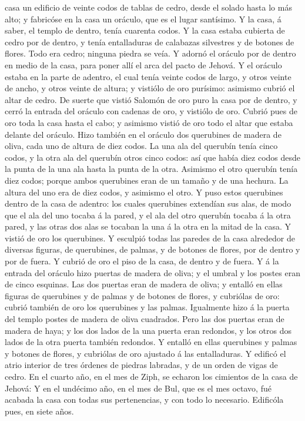 casa un edificio de veinte codos de tablas de cedro, desde el solado
hasta lo más alto; y fabricóse en la casa un oráculo, que es el lugar
santísimo.  Y la casa, á saber, el templo de dentro, tenía
cuarenta codos.  Y la casa estaba cubierta de cedro por de
dentro, y tenía entalladuras de calabazas silvestres y de botones de
flores. Todo era cedro; ninguna piedra se veía.  Y adornó
el oráculo por de dentro en medio de la casa, para poner allí el arca
del pacto de Jehová.  Y el oráculo estaba en la parte de
adentro, el cual tenía veinte codos de largo, y otros veinte de ancho, y
otros veinte de altura; y vistiólo de oro purísimo: asimismo cubrió el
altar de cedro.  De suerte que vistió Salomón de oro puro
la casa por de dentro, y cerró la entrada del oráculo con cadenas de
oro, y vistiólo de oro.  Cubrió pues de oro toda la casa
hasta el cabo; y asimismo vistió de oro todo el altar que estaba delante
del oráculo.  Hizo también en el oráculo dos querubines de
madera de oliva, cada uno de altura de diez codos.  La una
ala del querubín tenía cinco codos, y la otra ala del querubín otros
cinco codos: así que había diez codos desde la punta de la una ala hasta
la punta de la otra.  Asimismo el otro querubín tenía diez
codos; porque ambos querubines eran de un tamaño y de una hechura.
 La altura del uno era de diez codos, y asimismo el otro.
 Y puso estos querubines dentro de la casa de adentro: los
cuales querubines extendían sus alas, de modo que el ala del uno tocaba
á la pared, y el ala del otro querubín tocaba á la otra pared, y las
otras dos alas se tocaban la una á la otra en la mitad de la casa.
 Y vistió de oro los querubines.  Y esculpió
todas las paredes de la casa alrededor de diversas figuras, de
querubines, de palmas, y de botones de flores, por de dentro y por de
fuera.  Y cubrió de oro el piso de la casa, de dentro y de
fuera.  Y á la entrada del oráculo hizo puertas de madera
de oliva; y el umbral y los postes eran de cinco esquinas. 
Las dos puertas eran de madera de oliva; y entalló en ellas figuras de
querubines y de palmas y de botones de flores, y cubriólas de oro:
cubrió también de oro los querubines y las palmas. 
Igualmente hizo á la puerta del templo postes de madera de oliva
cuadrados.  Pero las dos puertas eran de madera de haya; y
los dos lados de la una puerta eran redondos, y los otros dos lados de
la otra puerta también redondos.  Y entalló en ellas
querubines y palmas y botones de flores, y cubriólas de oro ajustado á
las entalladuras.  Y edificó el atrio interior de tres
órdenes de piedras labradas, y de un orden de vigas de cedro.
 En el cuarto año, en el mes de Ziph, se echaron los
cimientos de la casa de Jehová:  Y en el undécimo año, en
el mes de Bul, que es el mes octavo, fué acabada la casa con todas sus
pertenencias, y con todo lo necesario. Edificóla pues, en siete años.

